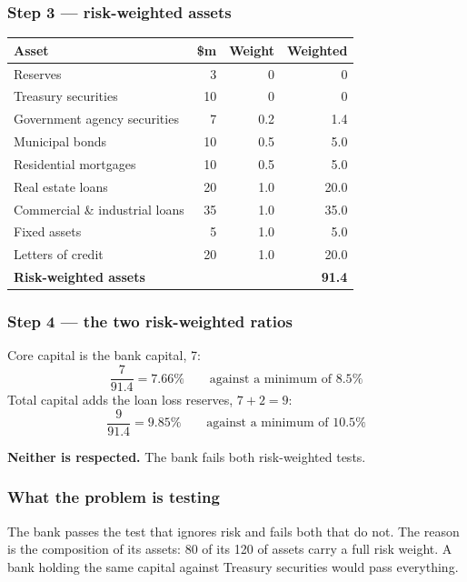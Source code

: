 \documentclass[11pt,a4paper]{article}
\newcommand{\keylab}[1]{\textcolor{ifclay}{\textbf{#1}}}
\begin{document}
\subsubsection*{Step 3 --- risk-weighted assets}

\begin{center}
\renewcommand{\arraystretch}{1.15}
\begin{tabular}{@{}lrrr@{}}
\toprule
{\color{ifteal}\bfseries Asset} & {\color{ifteal}\bfseries \$m} & {\color{ifteal}\bfseries Weight} & {\color{ifteal}\bfseries Weighted}\\
\midrule
Reserves & 3 & 0 & 0 \\
Treasury securities & 10 & 0 & 0 \\
Government agency securities & 7 & 0.2 & 1.4 \\
Municipal bonds & 10 & 0.5 & 5.0 \\
Residential mortgages & 10 & 0.5 & 5.0 \\
Real estate loans & 20 & 1.0 & 20.0 \\
Commercial \& industrial loans & 35 & 1.0 & 35.0 \\
Fixed assets & 5 & 1.0 & 5.0 \\
Letters of credit & 20 & 1.0 & 20.0 \\
\midrule
\textbf{Risk-weighted assets} & & & \textbf{91.4}\\
\bottomrule
\end{tabular}
\end{center}

\subsubsection*{Step 4 --- the two risk-weighted ratios}
Core capital is the bank capital, 7:
\[ \frac{7}{91.4} = \mathbf{7.66\%} \qquad \text{against a minimum of } 8.5\% \]
Total capital adds the loan loss reserves, $7 + 2 = 9$:
\[ \frac{9}{91.4} = \mathbf{9.85\%} \qquad \text{against a minimum of } 10.5\% \]
\begin{keybox}
\keylab{Neither is respected.} The bank fails both risk-weighted tests.
\end{keybox}

\subsubsection*{What the problem is testing}

The bank passes the test that ignores risk and fails both that do not. The
reason is the composition of its assets: 80 of its 120 of assets carry a full
risk weight. A bank holding the same capital against Treasury securities would
pass everything.
\end{document}
